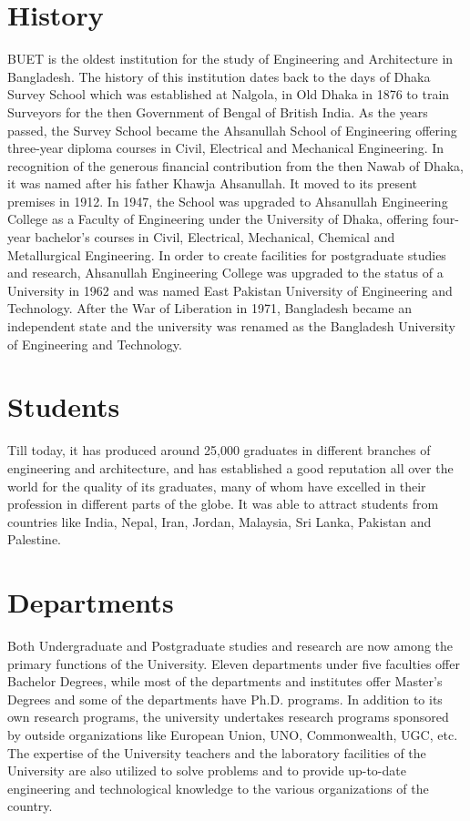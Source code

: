 \section{History}
BUET is the oldest institution for the study of Engineering and
Architecture in Bangladesh. The history of this institution dates back
to the days of Dhaka Survey School which was established at
Nalgola, in Old Dhaka in 1876 to train Surveyors for
the then Government of Bengal of British India. As the years passed,
the Survey School became the Ahsanullah School of
Engineering offering
three-year diploma courses in Civil, Electrical and Mechanical
Engineering. In recognition of the generous financial contribution
from the then Nawab of Dhaka, it was named after his father Khawja
Ahsanullah. It moved to its present premises in 1912. In 1947, the
School was upgraded to Ahsanullah Engineering College as a Faculty of
Engineering under the University of Dhaka, offering four-year
bachelor’s courses in Civil, Electrical, Mechanical, Chemical and
Metallurgical Engineering. In order to create facilities for
postgraduate studies and research, Ahsanullah Engineering College was
upgraded to the status of a University in 1962 and was named East
Pakistan University of Engineering and Technology. After the War of
Liberation in 1971, Bangladesh became an independent state and the
university was renamed as the Bangladesh University of Engineering and
Technology.
 
\section{Students}
Till today, it has produced around 25,000 graduates in different
branches of engineering and architecture, and has established a good
reputation all over the world for the quality of its graduates, many
of whom have excelled in their profession in different parts of the
globe. It was able to attract students from countries like
India, Nepal, Iran,
Jordan, Malaysia, Sri Lanka, Pakistan and Palestine.
 
\section{Departments}
Both Undergraduate and Postgraduate studies and research are now among
the primary functions of the University. Eleven departments under five
faculties offer Bachelor Degrees, while most of the departments and
institutes offer Master's Degrees and some of the departments have
Ph.D. programs. In addition to its own research programs, the
university undertakes research programs sponsored by outside
organizations like European Union, UNO,
Commonwealth, UGC, etc. The expertise
of the University teachers and the laboratory facilities of the
University are also utilized to solve problems and to provide
up-to-date engineering and technological knowledge to the various
organizations of the country.


\endinput